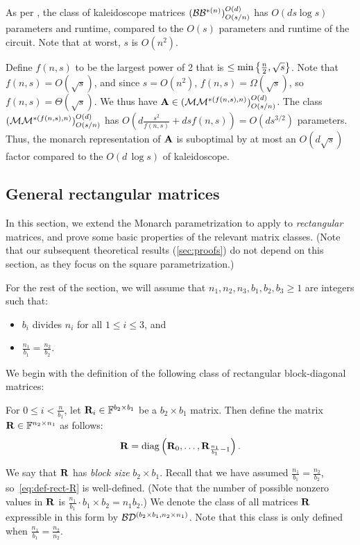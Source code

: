 As per \cite{dao2020kaleidoscope}, the class of kaleidoscope matrices $(\mathcal{B}\mathcal{B}^{*(n)})^{O(d)}_{O(s/n)}$ has $O(ds \log s)$ parameters and runtime, compared to the $O(s)$ parameters and runtime of the circuit. Note that at worst, $s$ is $O(n^2)$.

Define $f(n,s)$ to be the largest power of 2 that is $\le \min\left\{\tfrac{n}{2}, \sqrt{s}\right\}$. Note that $f(n,s) = O(\sqrt{s})$, and since $s = O(n^2)$, $f(n,s) = \Omega(\sqrt{s})$, so $f(n,s) = \Theta(\sqrt{s})$. %
We thus have $\mathbf{A} \in (\mathcal{M}\mathcal{M}^{*(f(n,s), n)})^{O(d)}_{O(s/n)}$. The class $(\mathcal{M}\mathcal{M}^{*(f(n,s), n)})^{O(d)}_{O(s/n)}$ has $O(d\frac{s^2}{f(n,s)} + dsf(n,s)) = O(ds^{3/2})$ parameters. Thus, the monarch representation of $\mathbf{A}$ is suboptimal by at most an $O(d\sqrt{s})$ factor compared to the $O(d{}\,\log s)$ of kaleidoscope.

\subsection{General rectangular matrices}
\label{sec:Monarch_rect}
In this section, we extend the Monarch parametrization to apply to \emph{rectangular} matrices, and prove some basic properties of the relevant matrix classes. (Note that our subsequent theoretical results (\cref{sec:proofs}) do not depend on this section, as they focus on the square parametrization.)

For the rest of the section, we will assume that $n_1, n_2, n_3, b_1, b_2 , b_3 \ge 1$ are integers such that:
\begin{itemize}
\item $b_i$ divides $n_i$ for all $1\le i\le 3$, and 
\item $\frac{n_1}{b_1} = \frac{n_2}{b_2}$.
\end{itemize}

We begin with the definition of the following class of rectangular block-diagonal matrices:
\begin{definition}
\label{def:monarch_rectangular}
For $0\le i< \frac{n}{b_1}$, let $\mathbf{R}_{i}\in\mathbb{F}^{b_2 \times b_1}$ be a $b_2 \times b_1$ matrix. Then define the matrix $\mathbf{R} \in \mathbb{F}^{n_2\times n_1}$ as follows:
\begin{equation}
 \label{eq:def-rect-R}
  \mathbf{R} = \mathrm{diag}\left(\mathbf{R}_0, \dots, \mathbf{R}_{\frac {n_1}{b_1}-1}\right).
\end{equation}
\end{definition}
We say that $\mathbf{R}$ has {\em block size} $b_2 \times b_1$. Recall that we have assumed $\frac {n_1}{b_1}=\frac{n_2}{b_2}$, so~\cref{eq:def-rect-R} is well-defined.
(Note that the number of possible nonzero values in $\mathbf{R}$ is $\frac {n_1}{b_1}\cdot b_1 \times b_2 =n_1b_2$.)
We denote the class of all matrices $\mathbf{R}$ expressible in this form by $\mathcal{B}\mathcal{D}^{(b_2 \times b_1, n_2 \times n_1)}$.
Note that this class is only defined when $\frac {n_1}{b_1}=\frac{n_2}{n_2}$.



